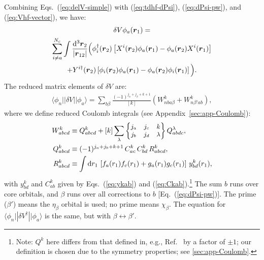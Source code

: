 \documentclass[10pt,twocolumn,a4paper]{article}%
\newcommand{\bra}[1]{\ensuremath{\langle #1|}}	%
\newcommand{\ket}[1]{\ensuremath{|#1\rangle}}	%
\newcommand{\sixj}[6]{\small\ensuremath{\begin{Bmatrix}#1&#2&#3\\#4&#5&#6\end{Bmatrix}}}	%
\renewcommand{\v}[1]{\ensuremath{\boldsymbol{#1}}}		%
\newcommand{\be}{\begin{equation}}
\newcommand{\ee}{\end{equation}}
\def\d{\ensuremath{{\rm d}}}
\renewcommand{\b}{\ensuremath{\beta}}
\begin{document}
Combining Eqs.~(\ref{eq:delV-simple}) with (\ref{eq:tdhf-dPsi}), (\ref{eq:dPsi-pw}), and (\ref{eq:Vhf-vector}), we have:
\begin{multline}\label{eq:del-Vhf-vector}
\delta V\phi_a(\v{r}_1) = \\
\sum_{i\neq a}^{N_c}\int \frac{\d^3\v{r}_2}{|\v{r}_{12}|}
\Big(
\phi_i^\dag(\v{r}_2)\left[
X^i(\v{r}_2)\phi_a(\v{r}_1)
-\phi_a(\v{r}_2)  X^i(\v{r}_1)\right]\\
%
+Y^{i\dag}(\v{r}_2)\left[
\phi_i(\v{r}_2)  \phi_a(\v{r}_1)
-\phi_a(\v{r}_2) \phi_i(\v{r}_1)\right]
\Big).
\end{multline}
%
The reduced matrix elements of $\delta V$ are:
\begin{multline}\label{eq:dV-rme}
\bra{\phi_n}|\delta V|\ket{\phi_a}
 = 
 \sum_{b\beta}\frac{(-1)^{j_n+j_\beta+k+1}}{[k]} 
\left(
W^k_{nba\b} + W^k_{n\b'ab}\right),
\end{multline}
where we define reduced Coulomb integrals (see Appendix~\ref{sec:app-Coulomb}):
\begin{align}
\label{eq:Wk}
W^k_{abcd} & %
\equiv Q^k_{abcd} + [k] \sum_\lambda \sixj{j_a}{j_c}{k}{j_b}{j_d}{\lambda}Q^\lambda_{abdc} ,\\
\label{eq:Qk}
Q^k_{abcd} &\equiv (-1)^{j_a+j_b+k+1} \, C^k_{ac} \, C^k_{bd} \, R^k_{abcd},\\
\label{eq:Rk}
R^k_{abcd} &\equiv \int\d r_1 \, \left[f_a(r_1)f_c(r_1) + g_a(r_1)g_c(r_1)\right]\, y^k_{bd}(r_1),
\end{align}
with $y^k_{bd}$ and $C^k_{ab}$ given by Eqs.~(\ref{eq:ykab}) and (\ref{eq:Ckab}).\footnote{Note: $Q^k$ here differs from that defined in, e.g., Ref.~\cite{DzubaHFS1984} by a factor of $\pm1$; our definition is chosen due to the symmetry properties; see \ref{sec:app-Coulomb}.}
The sum $b$ runs over core orbitals, and $\beta$ runs over all corrections to $b$ [Eq.~(\ref{eq:dPsi-pw})].
The prime ($\beta'$) means the $\eta_\beta$ orbital is used; no prime means $\chi_\beta$.
The equation for $\bra{\phi_n}|\delta V^\dag|\ket{\phi_a}$ is the same, but with $\beta\leftrightarrow\beta'$.


\end{document}
